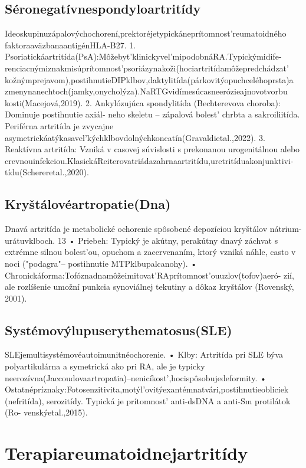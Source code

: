 \subsection{Séronegatívnespondyloartritídy}

Ideoskupinuzápalovýchochorení,prektoréjetypickáneprítomnost’reumatoidného faktoraaväzbanaantigénHLA-B27. 1. Psoriatickáartritída(PsA):Môžebyt’klinickyvel’mipodobnáRA.Typickýmidife- renciacnýmiznakmisúprítomnost’psoriázynakoži(hociartritídamôžepredchádzat’ kožnýmprejavom),postihnutieDIPklbov,daktylitída(párkovitýopuchceléhoprsta)a zmenynanechtoch(jamky,onycholýza).NaRTGvidímesúcasneerózieajnovotvorbu kosti(Macejová,2019). 2. Ankylózujúca spondylitída (Bechterevova choroba): Dominuje postihnutie axiál- neho skeletu -- zápalová bolest’ chrbta a sakroiliitída. Periférna artritída je zvycajne asymetrickáatýkasavel’kýchklbovdolnýchkoncatín(Gravaldietal.,2022). 3. Reaktívna artritída: Vzniká v casovej súvislosti s prekonanou urogenitálnou alebo crevnouinfekciou.KlasickáReiterovatriádazahrnaartritídu,uretritíduakonjunktivi- tídu(Schereretal.,2020).


\subsection{Kryštálovéartropatie(Dna)}

Dnavá artritída je metabolické ochorenie spôsobené depozíciou kryštálov nátrium- urátuvklboch. 13 • Priebeh: Typický je akútny, perakútny dnavý záchvat s extrémne silnou bolest’ou, opuchom a zacervenaním, ktorý vzniká náhle, casto v noci ("podagra"-- postihnutie MTPklbupalcanohy). • Chronickáforma:Tofóznadnamôžeimitovat’RAprítomnost’ouuzlov(tofov)aeró- zií, ale rozlíšenie umožní punkcia synoviálnej tekutiny a dôkaz kryštálov (Rovenský, 2001).


\subsection{Systémovýlupuserythematosus(SLE)}

SLEjemultisystémovéautoimunitnéochorenie. • Klby: Artritída pri SLE býva polyartikulárna a symetrická ako pri RA, ale je typicky neerozívna(Jaccoudovaartropatia)--nenicíkost’,hocispôsobujedeformity. • Ostatnépríznaky:Fotosenzitivita,motýl’ovitýexantémnatvári,postihnutieobliciek (nefritída), serozitídy. Typická je prítomnost’ anti-dsDNA a anti-Sm protilátok (Ro- venskýetal.,2015).


\section{Terapiareumatoidnejartritídy}

